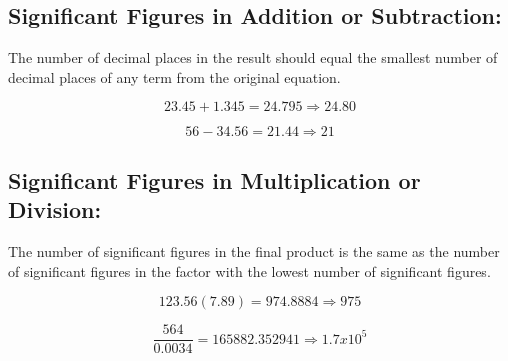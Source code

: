 \documentclass[12pt]{article}
\begin{document}
\subsection{Significant Figures in Addition or Subtraction:}
The number of decimal places in the result should
equal the smallest number of decimal places of any term from the original equation.

\begin{equation} \label{eq1}
    23.45 + 1.345 = 24.795 ⇒ 24.80
\end{equation}

\begin{equation} \label{eq2}
    56 - 34.56 = 21.44 ⇒ 21
\end{equation}

\subsection{Significant Figures in Multiplication or Division:}
The number of significant figures in the final product
is the same as the number of significant figures in the
factor with the lowest number of significant figures.

\begin{equation} \label{eq3}
    123.56(7.89) = 974.8884 ⇒ 975
\end{equation}

\begin{equation} \label{eq4}
    \frac{564}{0.0034} = 165882.352941 ⇒ 1.7x10^5
\end{equation}
\end{document}
